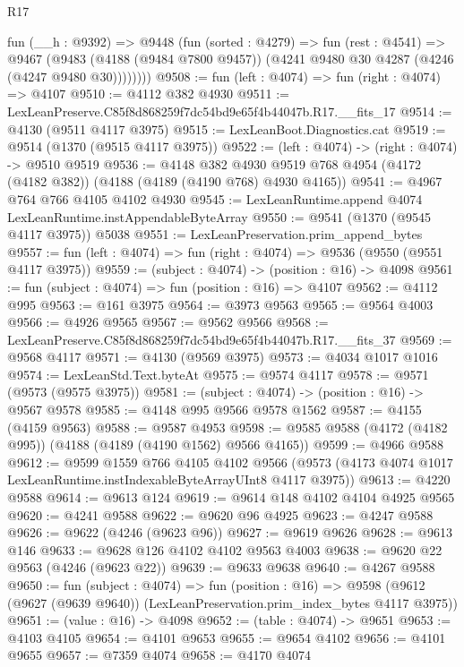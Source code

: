 \begin{lexlean}{R17}
\begin{coremodule}
        fun (__h : @9392) =>
        @9448
          (fun (sorted : @4279) =>
          fun (rest : @4541) =>
          @9467
            (@9483
              (@4188 (@9484 @7800 @9457))
              (@4241 @9480 @30 @4287 (@4246 (@4247 @9480 @30))))))))
@9508 := fun (left : @4074) => fun (right : @4074) => @4107
@9510 := @4112 @382 @4930
@9511 := LexLeanPreserve.C85f8d868259f7dc54bd9e65f4b44047b.R17.__fits_17
@9514 := @4130 (@9511 @4117 @3975)
@9515 := LexLeanBoot.Diagnostics.cat
@9519 := @9514 (@1370 (@9515 @4117 @3975))
@9522 := (left : @4074) -> (right : @4074) -> @9510 @9519
@9536 := @4148
    @382
    @4930
    @9519
    @768
    @4954
    (@4172 (@4182 @382))
    (@4188 (@4189 (@4190 @768) @4930 @4165))
@9541 := @4967 @764 @766 @4105 @4102 @4930
@9545 := LexLeanRuntime.append @4074 LexLeanRuntime.instAppendableByteArray
@9550 := @9541 (@1370 (@9545 @4117 @3975)) @5038
@9551 := LexLeanPreservation.prim_append_bytes
@9557 := fun (left : @4074) => fun (right : @4074) => @9536 (@9550 (@9551 @4117 @3975))
@9559 := (subject : @4074) -> (position : @16) -> @4098
@9561 := fun (subject : @4074) => fun (position : @16) => @4107
@9562 := @4112 @995
@9563 := @161 @3975
@9564 := @3973 @9563
@9565 := @9564 @4003
@9566 := @4926 @9565
@9567 := @9562 @9566
@9568 := LexLeanPreserve.C85f8d868259f7dc54bd9e65f4b44047b.R17.__fits_37
@9569 := @9568 @4117
@9571 := @4130 (@9569 @3975)
@9573 := @4034 @1017 @1016
@9574 := LexLeanStd.Text.byteAt
@9575 := @9574 @4117
@9578 := @9571 (@9573 (@9575 @3975))
@9581 := (subject : @4074) -> (position : @16) -> @9567 @9578
@9585 := @4148 @995 @9566 @9578 @1562
@9587 := @4155 (@4159 @9563)
@9588 := @9587 @4953
@9598 := @9585 @9588 (@4172 (@4182 @995)) (@4188 (@4189 (@4190 @1562) @9566 @4165))
@9599 := @4966 @9588
@9612 := @9599
    @1559
    @766
    @4105
    @4102
    @9566
    (@9573 (@4173 @4074 @1017 LexLeanRuntime.instIndexableByteArrayUInt8 @4117 @3975))
@9613 := @4220 @9588
@9614 := @9613 @124
@9619 := @9614 @148 @4102 @4104 @4925 @9565
@9620 := @4241 @9588
@9622 := @9620 @96 @4925
@9623 := @4247 @9588
@9626 := @9622 (@4246 (@9623 @96))
@9627 := @9619 @9626
@9628 := @9613 @146
@9633 := @9628 @126 @4102 @4102 @9563 @4003
@9638 := @9620 @22 @9563 (@4246 (@9623 @22))
@9639 := @9633 @9638
@9640 := @4267 @9588
@9650 := fun (subject : @4074) =>
  fun (position : @16) =>
  @9598 (@9612 (@9627 (@9639 @9640)) (LexLeanPreservation.prim_index_bytes @4117 @3975))
@9651 := (value : @16) -> @4098
@9652 := (table : @4074) -> @9651
@9653 := @4103 @4105
@9654 := @4101 @9653
@9655 := @9654 @4102
@9656 := @4101 @9655
@9657 := @7359 @4074
@9658 := @4170 @4074

\end{coremodule}
\end{lexlean}
